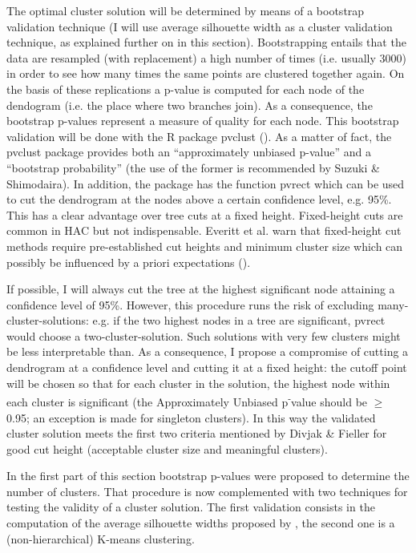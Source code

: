 The optimal cluster solution will be determined by means of a bootstrap validation technique (I will use average silhouette width as a cluster validation technique, as explained further on in this section). Bootstrapping entails that the data are resampled (with replacement) a high number of times (i.e. usually 3000) in order to see how many times the same points are clustered together again. On the basis of these replications a p-value is computed for each node of the dendogram (i.e. the place where two branches join). As a consequence, the bootstrap p-values represent a measure of quality for each node. This bootstrap validation will be done with the R package pvclust (\citealt{suzuki_pvclust:_2006}). As a matter of fact, the pvclust package provides both an “approximately unbiased p-value” and a “bootstrap probability” (the use of the former is recommended by Suzuki \& Shimodaira). In addition, the package has the function pvrect which can be used to cut the dendrogram at the nodes above a certain confidence level, e.g. 95\%. This has a clear advantage over tree cuts at a fixed height. Fixed-height cuts are common in HAC but not indispensable. Everitt et al. warn that fixed-height cut methods require pre-established cut heights and minimum cluster size which can possibly be influenced by a priori expectations (\citeyear[95]{everitt_cluster_2011}).



If possible, I will always cut the tree at the highest significant node attaining a confidence level of 95\%. However, this procedure runs the risk of excluding many-cluster-solutions: e.g. if the two highest nodes in a tree are significant, pvrect would choose a two-cluster-solution. Such solutions with very few clusters might be less interpretable than. As a consequence, I propose a compromise of cutting a dendrogram at a confidence level and cutting it at a fixed height: the cutoff point will be chosen so that for each cluster in the solution, the highest node within each cluster is significant (the Approximately Unbiased p\textsuperscript{{}-}value should be ${\geq}$ 0.95; an exception is made for singleton clusters). In this way the validated cluster solution meets the first two criteria mentioned by Divjak \& Fieller for good cut height (acceptable cluster size and meaningful clusters).





In the first part of this section bootstrap p-values were proposed to determine the number of clusters. That procedure is now complemented with two techniques for testing the validity of a cluster solution. The first validation consists in the computation of the average silhouette widths proposed by \citet{kaufman_finding_1990}, the second one is a (non-hierarchical) K-means clustering.



